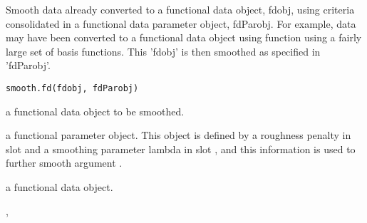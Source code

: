 \begin{Description}\relax
Smooth data already converted to a functional data object, fdobj,
using criteria consolidated in a functional data parameter object,
fdParobj.  For example, data may have been converted to a functional
data object using function  using a fairly large set of
basis functions.  This 'fdobj' is then smoothed as specified in
'fdParobj'.
\end{Description}
\begin{Usage}
\begin{verbatim}
smooth.fd(fdobj, fdParobj)
\end{verbatim}
\end{Usage}
\begin{Arguments}
\begin{ldescription}
\item[\code{fdobj}] a functional data object to be smoothed.

\item[\code{fdParobj}] a functional parameter object. This object is defined by a roughness
penalty in slot  and a smoothing parameter lambda in slot
, and this information is used to further smooth argument .

\end{ldescription}
\end{Arguments}
\begin{Value}
a functional data object.
\end{Value}
\begin{SeeAlso}\relax
{}, 
\end{SeeAlso}
